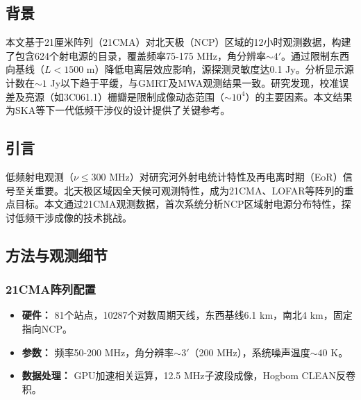 \documentclass{article}
\begin{document}
\subsection{背景}
本文基于21厘米阵列（21CMA）对北天极（NCP）区域的12小时观测数据，构建了包含624个射电源的目录，覆盖频率75-175 MHz，角分辨率$\sim 4'$。通过限制东西向基线（$L < 1500$ m）降低电离层效应影响，源探测灵敏度达0.1 Jy。分析显示源计数在$\sim 1$ Jy以下趋于平缓，与GMRT及MWA观测结果一致。研究发现，校准误差及亮源（如3C061.1）栅瓣是限制成像动态范围（$\sim 10^4$）的主要因素。本文结果为SKA等下一代低频干涉仪的设计提供了关键参考。
\subsection{引言}
低频射电观测（$\nu \leq 300$ MHz）对研究河外射电统计特性及再电离时期（EoR）信号至关重要。北天极区域因全天候可观测特性，成为21CMA、LOFAR等阵列的重点目标。本文通过21CMA观测数据，首次系统分析NCP区域射电源分布特性，探讨低频干涉成像的技术挑战。

\subsection{方法与观测细节}
\subsubsection{21CMA阵列配置}
\begin{itemize}
    \item \textbf{硬件：} 81个站点，10287个对数周期天线，东西基线6.1 km，南北4 km，固定指向NCP。
    \item \textbf{参数：} 频率50-200 MHz，角分辨率$\sim 3'$（200 MHz），系统噪声温度$\sim 40$ K。
    \item \textbf{数据处理：} GPU加速相关运算，12.5 MHz子波段成像，Hogbom CLEAN反卷积。
\end{itemize}
\end{document}
